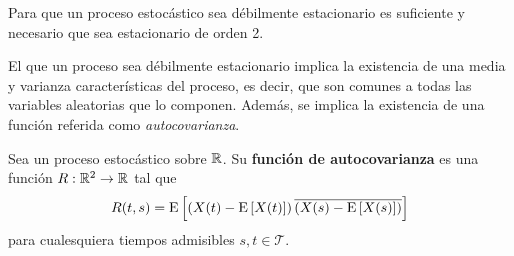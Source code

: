\begin{proposicion}
Para que un proceso estocástico \xt sea débilmente estacionario es suficiente y necesario que sea estacionario de orden 2.
\end{proposicion}

%

El que un proceso sea débilmente estacionario implica la existencia de una media y varianza características del proceso, es decir, que son comunes a todas las variables aleatorias que lo componen. 
%
Además, se implica la existencia de una función referida como \textit{autocovarianza}.

\begin{definicion}
Sea \xt un proceso estocástico sobre $\mathbb{R}$. Su \textbf{función de autocovarianza} es una función $R: \mathbb{R}^{2}\rightarrow \mathbb{R}$ tal que
\begin{equation}
R(t,s) = \mathrm{E}\left[ \left(X(t) - \mathrm{E}\left[ X(t) \right]\right)\overline{\left(X(s) - \mathrm{E}\left[ X(s) \right]\right)} \right]
\end{equation} 
para cualesquiera tiempos admisibles $s, t \in \mathcal{T}$.
\end{definicion}

